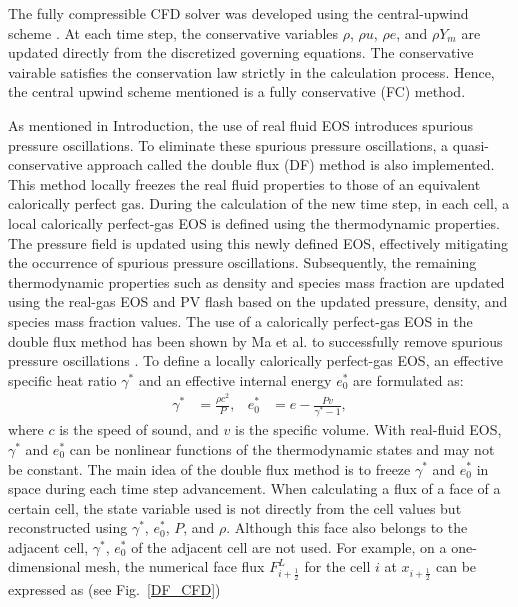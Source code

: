 The fully compressible CFD solver was developed using the central-upwind scheme \cite{kurganov2001semidiscrete,greenshields2010implementation}. At each time step, the conservative variables $\rho$, $\rho u$, $\rho e$, and $\rho Y_m$ are updated directly from the discretized governing equations. The conservative vairable satisfies the conservation law strictly in the calculation process. Hence, the central upwind scheme mentioned is a fully conservative (FC) method. 

As mentioned in Introduction, the use of real fluid EOS introduces spurious pressure oscillations. To eliminate these spurious pressure oscillations, a quasi-conservative approach called the double flux (DF) method \cite{abgrall2001computations,billet2003adaptive,ma2017entropy} is also implemented.
This method locally freezes the real fluid properties to those of an equivalent calorically perfect gas. During the calculation of the new time step, in each cell, a local calorically perfect-gas EOS is defined using the thermodynamic properties. The pressure field is updated using this newly defined EOS, effectively mitigating the occurrence of spurious pressure oscillations. Subsequently, the remaining thermodynamic properties such as density and species mass fraction are updated using the real-gas EOS and PV flash based on the updated pressure, density, and species mass fraction values. The use of a calorically perfect-gas EOS in the double flux method has been shown by Ma et al. to successfully remove spurious pressure oscillations \cite{ma2017entropy}. To define a locally calorically perfect-gas EOS, an effective specific heat ratio $\gamma^*$ and an effective internal energy $e_0^*$  are formulated as:
\begin{align}
\gamma^*& = \frac{\rho c^2}{P},&e_0^*&= e-\frac{Pv}{\gamma^*-1},
\end{align}
where $c$ is the speed of sound, and $v$ is the specific volume. %
With real-fluid EOS, $\gamma^*$ and $e_0^*$ can be nonlinear functions of the thermodynamic states and may not be constant. The main idea of the double flux method is to freeze $\gamma^*$ and $e_0^*$ in space during each time step advancement. When calculating a flux of a face of a certain cell, the state variable used is not directly from the cell values but reconstructed using $\gamma^*$, $e_0^*$, $P$, and $\rho$. Although this face also belongs to the adjacent cell, $\gamma^*$, $e_0^*$ of the adjacent cell are not used.  For example, on a one-dimensional mesh, the numerical face flux $F^L_{i+\frac{1}{2}}$ for the cell $i$ at $x_{i+\frac{1}{2}}$ can be expressed as (see Fig.~\ref{DF_CFD})
